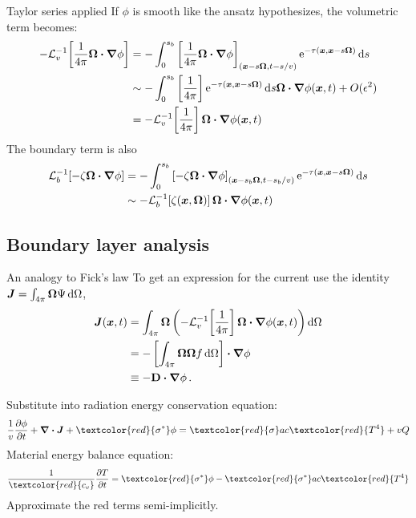 \documentclass{beamer}
\begin{document}
\begin{frame}{Taylor series applied}
  If $\phi$ is smooth like the ansatz hypothesizes, the volumetric term becomes:
  \begin{align} \nonumber
  -\mathcal{L}_{v}^{-1}\!\left[ \frac{1}{4\pi} \bm{\Omega}\bm{\cdot} \bm{\nabla} \phi \right]
  &= -\int_{0}^{s_b}
    \left[ \frac{1}{4\pi} \bm{\Omega}\bm{\cdot} \bm{\nabla} \phi \right]_{(\bm{x} - s
    \bm{\Omega}, t-s/v)}
    \mathop{}\!\mathrm{e}^{ -\tau(\bm{x}, \bm{x} - s \bm{\Omega})}
    \mathop{}\!\mathrm{d} s
  \\\nonumber
  &\sim - \int_{0}^{s_b}
    \left[ \frac1{4\pi}\right]
    \mathop{}\!\mathrm{e}^{ -\tau(\bm{x}, \bm{x} - s \bm{\Omega})} \mathop{}\!\mathrm{d} s
    \bm{\Omega}\bm{\cdot} \bm{\nabla} \phi(\bm{x},t) + O(\epsilon^2)
  \\\label{eq:tildeS}
  &= - \mathcal{L}_{v}^{-1}\!\left[ \frac1{4\pi} \right] \bm{\Omega}\bm{\cdot} \bm{\nabla} \phi(\bm{x},t)
  \end{align}
  The boundary term is also
  \begin{align} \nonumber
  \mathcal{L}_{b}^{-1}\!\left[ -\zeta \bm{\Omega}\bm{\cdot} \bm{\nabla} \phi \right]
  &= -\int_{0}^{s_b}
    \left[-\zeta \bm{\Omega}\bm{\cdot} \bm{\nabla} \phi \right]_{(\bm{x} - s_b
    \bm{\Omega}, t-s_b/v)}
    \mathop{}\!\mathrm{e}^{ -\tau(\bm{x}, \bm{x} - s \bm{\Omega})}
    \mathop{}\!\mathrm{d} s
  \\ \label{eq:tildeB}
  &\sim - \mathcal{L}_{b}^{-1}\!\left[ \zeta(\bm{x}, \bm{\Omega}) \right]
  \bm{\Omega}\bm{\cdot} \bm{\nabla} \phi(\bm{x},t)
  \end{align}
\end{frame}

\subsection{Boundary layer analysis}

\begin{frame}{An analogy to Fick's law}
  To get an expression for the current use the
  identity
  $\bm{J} = \int_{4\pi}\bm{\Omega} \Psi \mathop{}\!\mathrm{d}\Omega$,
  \begin{align*}
    \bm{J}(\bm{x}, t)
    &= \int_{4\pi}\bm{\Omega} \left( - \mathcal{L}_{v}^{-1}\!\left[
    \frac1{4\pi} \right] \bm{\Omega}\bm{\cdot} \bm{\nabla} \phi(\bm{x},t) \right)
    \mathop{}\!\mathrm{d}\Omega
    \\
      &= - \left[ \int_{4\pi}\bm{\Omega}\bm{\Omega} f \mathop{}\!\mathrm{d}\Omega\right] \bm{\cdot} \bm{\nabla} \phi
    \\
      &\equiv -\mathbf{D} \bm{\cdot} \bm{\nabla} \phi \,.
  \end{align*}

  Substitute into radiation energy conservation equation:
\begin{equation*}
  \frac{1}{v} \pder{\phi}{t}
  + \del \vd \vec{J} + \textcolor{red}{\sigma^*} \phi
  = \textcolor{red}{\sigma} ac\textcolor{red}{T^4}
  + v Q
\end{equation*}
Material energy balance equation:
\begin{equation*}
  \frac{1}{\textcolor{red}{c_v}}\pder{T}{t} = \textcolor{red}{\sigma^*} \phi -
  \textcolor{red}{\sigma^*} ac\textcolor{red}{T^4}
\end{equation*}
Approximate the red terms semi-implicitly.
\end{frame}
\end{document}
